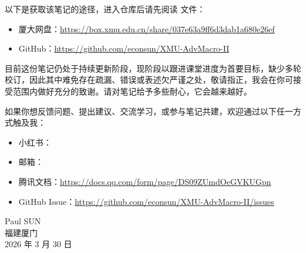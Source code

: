 \myskip
{}

以下是获取该笔记的途径，进入仓库后请先阅读  文件：
\begin{itemize}
    \item 厦大网盘：\url{https://box.xmu.edu.cn/share/037e63a9ff6d3dab1a680e26ef}
    \item GitHub：\url{https://github.com/econsun/XMU-AdvMacro-II}
\end{itemize}

\myskip
{}

目前这份笔记仍处于持续更新阶段，现阶段以跟进课堂进度为首要目标，缺少多轮校订，因此其中难免存在疏漏、错误或表述欠严谨之处，敬请指正，我会在你可接受范围内做好充分的致谢。请对笔记给予多些耐心，它会越来越好。

如果你想反馈问题、提出建议、交流学习，或参与笔记共建，欢迎通过以下任一方式触及我：
\begin{itemize}
    \item 小红书：
    \item 邮箱：
    \item 腾讯文档：\url{https://docs.qq.com/form/page/DS09ZUmdOeGVKUGpn}
    \item GitHub Issue：\url{https://github.com/econsun/XMU-AdvMacro-II/issues}
\end{itemize}

\vspace{\baselineskip}
\begin{flushright}
Paul SUN\\
福建\hspace{0.35em}\textperiodcentered\hspace{0.35em}厦门\\
2026 年 3 月 30 日
\end{flushright}

\clearpage
\pagestyle{symplain}




